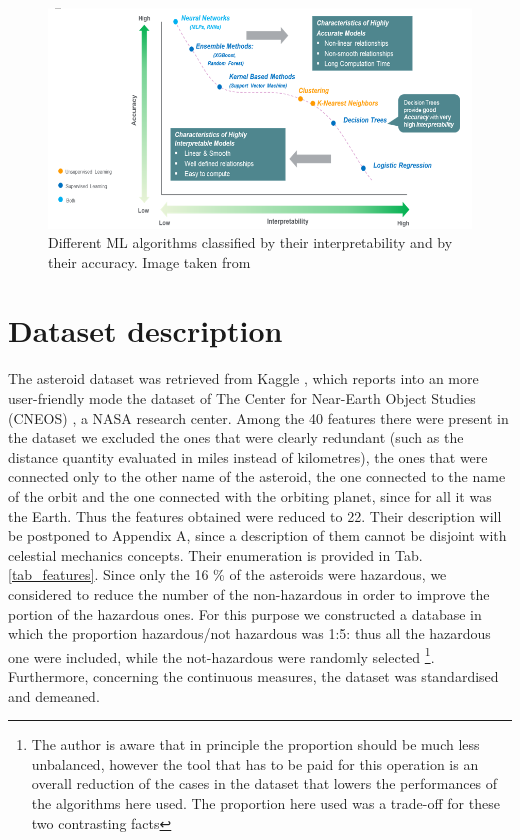 \documentclass[12pt,%
               a4paper,%
               oneside,openany,%
               titlepage,%
               headinclude,footinclude,%
               BCOR5mm,%
               cleardoublepage=empty,%
               tablecaptionabove,%
               floatperchapter,
               ]{scrreprt}                 %
\begin{document}
\begin{figure}[h]
\begin{center}
\includegraphics[width=1\textwidth]{Figures/ML_intepretability.png}
\caption{Different ML algorithms classified by their interpretability and by their accuracy. Image taken from \cite{ml_interpretability}}
\label{ML_intepretability}
\end{center}
\end{figure}


\chapter{Dataset description}

The asteroid dataset was retrieved from Kaggle \cite{kaggle_dataset}, which reports into an more user-friendly mode the dataset of The Center for Near-Earth Object Studies (CNEOS) \cite{cneos+nasa}, a NASA research center. Among the 40 features there were present in the dataset we excluded the ones that were clearly redundant (such as the distance quantity evaluated in miles instead of kilometres), the ones that were connected only to the other name of the asteroid, the one connected to the name of the orbit and the one connected with the orbiting planet, since for all it was the Earth. Thus the features obtained were reduced to 22. Their description will be postponed to Appendix A, since a description of them cannot be disjoint with celestial mechanics concepts. Their enumeration is provided in Tab. \ref{tab_features}. Since only the 16 \% of the asteroids were hazardous, we considered to reduce the number of the non-hazardous in order to improve the portion of the hazardous ones. For this purpose we constructed a database in which the proportion hazardous/not hazardous was 1:5: thus all the hazardous one were included, while the not-hazardous were randomly selected \footnote{The author is aware that in principle the proportion should be much less unbalanced, however the tool that has to be paid for this operation is an overall reduction of the cases in the dataset that lowers the performances of the algorithms here used. The proportion here used was a trade-off for these two contrasting facts}. Furthermore, concerning the continuous measures, the dataset was standardised and demeaned. 
\end{document}
